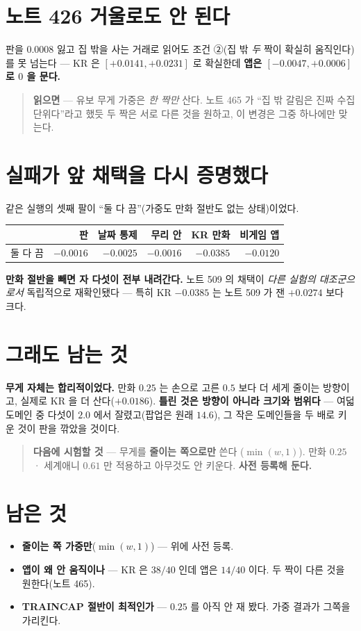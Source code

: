 \documentclass[11pt]{article}
\begin{document}
\section{노트 426 거울로도 안 된다}

판을 $0.0008$ 잃고 집 밖을 사는 거래로 읽어도 조건 ②(집 밖 \emph{두} 짝이
확실히 움직인다)를 못 넘는다 --- KR 은 $[+0.0141, +0.0231]$ 로 확실한데
\textbf{앱은 $[-0.0047, +0.0006]$ 로 $0$ 을 문다.}

\begin{quote}
\textbf{읽으면} --- 유보 무게 가중은 \emph{한 짝만} 산다. 노트 465 가
``집 밖 갈림은 진짜 수집 단위다''라고 했듯 두 짝은 서로 다른 것을 원하고,
이 변경은 그중 하나에만 맞는다.
\end{quote}

\section{실패가 앞 채택을 다시 증명했다}

같은 실행의 셋째 팔이 ``둘 다 끔''(가중도 만화 절반도 없는 상태)이었다.

\begin{center}
\begin{tabular}{lrrrrr}
\hline
& 판 & 날짜 통제 & 무리 안 & KR 만화 & 비게임 앱 \\
\hline
둘 다 끔 & $-0.0016$ & $-0.0025$ & $-0.0016$ & $\mathbf{-0.0385}$ & $\mathbf{-0.0120}$ \\
\hline
\end{tabular}
\end{center}

\textbf{만화 절반을 빼면 자 다섯이 전부 내려간다.} 노트 509 의 채택이
\emph{다른 실험의 대조군으로서} 독립적으로 재확인됐다 --- 특히 KR
$-0.0385$ 는 노트 509 가 잰 $+0.0274$ 보다 크다.

\section{그래도 남는 것}

\textbf{무게 자체는 합리적이었다.} 만화 $0.25$ 는 손으로 고른 $0.5$ 보다
더 세게 줄이는 방향이고, 실제로 KR 을 더 산다($+0.0186$). \textbf{틀린
것은 방향이 아니라 크기와 범위다} --- 여덟 도메인 중 다섯이 $2.0$ 에서
잘렸고(팝업은 원래 $14.6$), 그 작은 도메인들을 두 배로 키운 것이 판을
깎았을 것이다.

\begin{quote}
\textbf{다음에 시험할 것} --- 무게를 \textbf{줄이는 쪽으로만} 쓴다
($\min(w, 1)$). 만화 $0.25$ · 세계애니 $0.61$ 만 적용하고 아무것도 안
키운다. \textbf{사전 등록해 둔다.}
\end{quote}

\section*{남은 것}

\begin{itemize}
\item \textbf{줄이는 쪽 가중만}($\min(w,1)$) --- 위에 사전 등록.
\item \textbf{앱이 왜 안 움직이나} --- KR 은 $38/40$ 인데 앱은 $14/40$
이다. 두 짝이 다른 것을 원한다(노트 465).
\item \textbf{TRAINCAP 절반이 최적인가} --- $0.25$ 를 아직 안 재 봤다.
가중 결과가 그쪽을 가리킨다.
\end{itemize}
\end{document}
